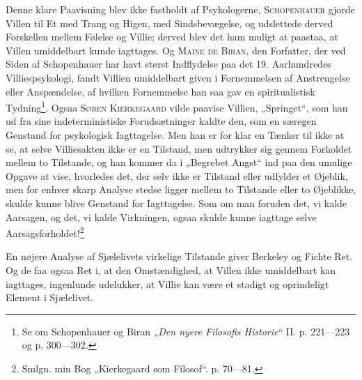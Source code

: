 \documentclass[12pt,a4paper,openany]{book}
\begin{document}
Denne klare Paavisning blev ikke fastholdt af Psykologerne,
\textsc{Schopenhauer} gjorde Villen til Et med Trang og Higen, med
Sindsbevægelse, og udslettede derved Forskellen mellem Følelse
og Villie; derved blev det ham muligt at paastaa, at Villen
umiddelbart kunde iagttages. Og \textsc{Maine de Biran}, den Forfatter,
der ved Siden af Schopenhauer har havt størst Indflydelse
paa det 19. Aarhundredes Villiespsykologi, fandt Villien
umiddelbart given i Fornemmelsen af Anstrengelse eller Anspændelse,
af hvilken Fornemmelse han saa gav en spiritualistisk
Tydning\footnote[1]{Se om Schopenhauer og Biran „\textit{Den nyere Filosofis Historie}“ II. p. 221---223 og p. 300---302.}. Ogsaa \textsc{Søren Kierkegaard} vilde paavise Villien,
„Springet“, som han ud fra sine indeterministiske Forudsætninger
kaldte den, som en særegen Genstand for psykologisk
Iagttagelse. Men han er for klar en Tænker til ikke at se, at
selve Villiesakten ikke er en Tilstand, men udtrykker sig gennem
Forholdet mellem to Tilstande, og han kommer da i „Begrebet
Angst“ ind paa den umulige Opgave at vise, hvorledes
det, der selv ikke er Tilstand eller udfylder et Øjeblik, men for
enhver skarp Analyse stedse ligger mellem to Tilstande eller
to Øjeblikke, skulde kunne blive Genstand for Iagttagelse. Som
om man foruden det, vi kalde Aarsagen, og det, vi kalde Virkningen,
ogsaa skulde kunne iagttage selve Aarsagsforholdet!\footnote[2]{Smlgn. min Bog „Kierkegaard som Filosof“. p. 70---81.}

En nøjere Analyse af Sjælelivets virkelige Tilstande giver
Berkeley og Fichte Ret. Og de faa ogsaa Ret i, at den Omstændighed,
at Villen ikke umiddelbart kan iagttages, ingenlunde
udelukker, at Villie kan være et stadigt og oprindeligt
Element i Sjælelivet.
\end{document}
